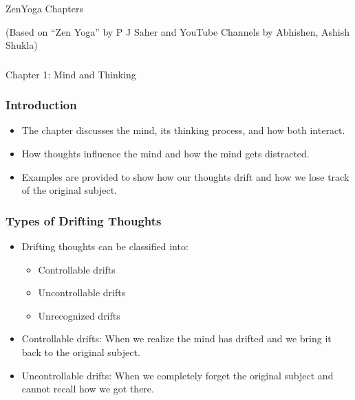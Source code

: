 \begin{frame}[fragile]\frametitle{}
\begin{center}
{\Large ZenYoga Chapters}


{\tiny (Based on ``Zen Yoga'' by P J Saher and YouTube Channels by Abhishen, Ashish Shukla)}
\end{center}
\end{frame}


\begin{frame}[fragile]\frametitle{}
\begin{center}
{\Large Chapter 1: Mind and Thinking}
\end{center}
\end{frame}

\begin{frame}[fragile]\frametitle{Introduction}

\begin{itemize}
    \item The chapter discusses the mind, its thinking process, and how both interact.
    \item How thoughts influence the mind and how the mind gets distracted.
    \item Examples are provided to show how our thoughts drift and how we lose track of the original subject.
\end{itemize}

\end{frame}


\begin{frame}[fragile]\frametitle{Types of Drifting Thoughts}

\begin{itemize}
    \item Drifting thoughts can be classified into:
    \begin{itemize}
        \item Controllable drifts
        \item Uncontrollable drifts
        \item Unrecognized drifts
    \end{itemize}
    \item Controllable drifts: When we realize the mind has drifted and we bring it back to the original subject.
    \item Uncontrollable drifts: When we completely forget the original subject and cannot recall how we got there.
\end{itemize}

\end{frame}

